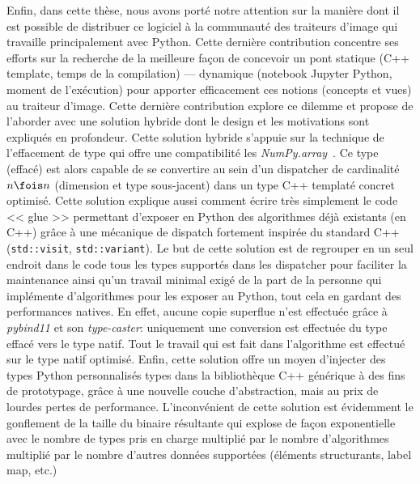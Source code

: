 Enfin, dans cette thèse, nous avons porté notre attention sur la manière dont il est possible de distribuer ce logiciel
à la communauté des traiteurs d'image qui travaille principalement avec Python. Cette dernière contribution concentre
ses efforts sur la recherche de la meilleure façon de concevoir un pont statique (C++ template, temps de la compilation)
--- dynamique (notebook Jupyter Python, moment de l'exécution) pour apporter efficacement ces notions (concepts et vues)
au traiteur d'image. Cette dernière contribution explore ce dilemme et propose de l'aborder avec une solution hybride
dont le design et les motivations sont expliqués en profondeur. Cette solution hybride s'appuie sur la technique de
l'effacement de type qui offre une compatibilité les \emph{NumPy.array}~\parencite{harris.2020.numpy}. Ce type (effacé)
est alors capable de se convertire au sein d'un dispatcher de cardinalité \(n \fois n\) (dimension et type sous-jacent)
dans un type C++ templaté concret optimisé. Cette solution explique aussi comment écrire très simplement le code << glue
>> permettant d'exposer en Python des algorithmes déjà existants (en C++) grâce à une mécanique de dispatch fortement
inspirée du standard C++ (\texttt{std::visit}, \texttt{std::variant}). Le but de cette solution est de regrouper en un
seul endroit dans le code tous les types supportés dans les dispatcher pour faciliter la maintenance ainsi qu'un travail
minimal exigé de la part de la personne qui implémente d'algorithmes pour les exposer au Python, tout cela en gardant
des performances natives. En effet, aucune copie superflue n'est effectuée grâce à \emph{pybind11} et son
\emph{type-caster}: uniquement une conversion est effectuée du type effacé vers le type natif. Tout le travail qui est
fait dans l'algorithme est effectué sur le type natif optimisé. Enfin, cette solution offre un moyen d'injecter des
types Python personnalisés types dans la bibliothèque C++ générique à des fins de prototypage, grâce à une nouvelle
couche d'abstraction, mais au prix de lourdes pertes de performance. L'inconvénient de cette solution est évidemment le
gonflement de la taille du binaire résultante qui explose de façon exponentielle avec le nombre de types pris en charge
multiplié par le nombre d'algorithmes multiplié par le nombre d'autres données supportées (éléments structurants, label
map, etc.)

